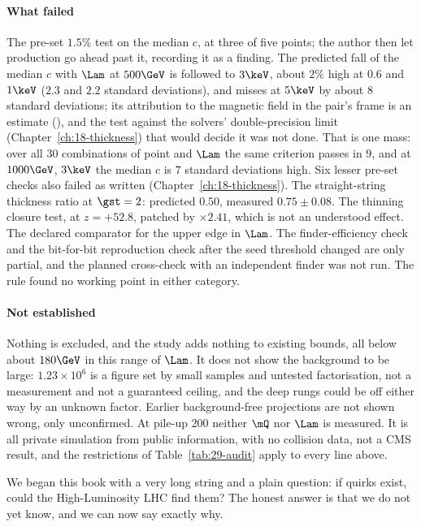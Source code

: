 \paragraph{What failed}
The pre-set $1.5\%$ test on the median $c$, at three of five points; the author then let production go ahead past it, recording it as a finding. The predicted fall of the median $c$ with $\Lam$ at $500\GeV$ is followed to $3\keV$, about $2\%$ high at $0.6$ and $1\keV$ ($2.3$ and $2.2$ standard deviations), and misses at $5\keV$ by about $8$ standard deviations; its attribution to the magnetic field in the pair's frame is an estimate (\EST), and the test against the solvers' double-precision limit (Chapter~\ref{ch:18-thickness}) that would decide it was not done. That is one mass: over all $30$ combinations of point and $\Lam$ the same criterion passes in $9$, and at $1000\GeV$, $3\keV$ the median $c$ is $7$ standard deviations high. Six lesser pre-set checks also failed as written (Chapter~\ref{ch:18-thickness}). The straight-string thickness ratio at $\gst=2$: predicted $0.50$, measured $0.75\pm0.08$. The thinning closure test, at $z=+52.8$, patched by $\times2.41$, which is not an understood effect. The declared comparator for the upper edge in $\Lam$. The finder-efficiency check and the bit-for-bit reproduction check after the seed threshold changed are only partial, and the planned cross-check with an independent finder was not run. The rule found no working point in either category.

\paragraph{Not established}
Nothing is excluded, and the study adds nothing to existing bounds, all below about $180\GeV$ in this range of $\Lam$. It does not show the background to be large: $1.23\times10^6$ is a figure set by small samples and untested factorisation, not a measurement and not a guaranteed ceiling, and the deep rungs could be off either way by an unknown factor. Earlier background-free projections are not shown wrong, only unconfirmed. At pile-up 200 neither $\mQ$ nor $\Lam$ is measured. It is all private simulation from public information, with no collision data, not a CMS result, and the restrictions of Table~\ref{tab:29-audit} apply to every line above.

\bigskip
We began this book with a very long string and a plain question: if quirks exist, could the High-Luminosity LHC find them? The honest answer is that we do not yet know, and we can now say exactly why.


